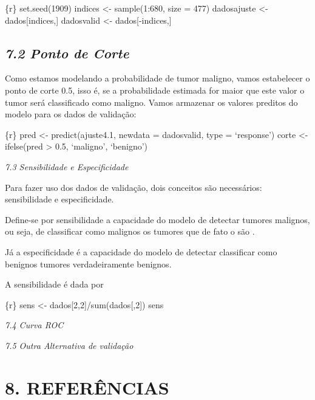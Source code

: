 \documentclass[]{article}
\begin{document}
\{r\} set.seed(1909) indices \textless{}- sample(1:680, size = 477)
dadosajuste \textless{}- dados{[}indices,{]} dadosvalid \textless{}-
dados{[}-indices,{]}

\subsection{\texorpdfstring{\emph{7.2 Ponto de
Corte}}{7.2 Ponto de Corte}}\label{ponto-de-corte}

Como estamos modelando a probabilidade de tumor maligno, vamos
estabelecer o ponto de corte 0.5, isso é, se a probabilidade estimada
for maior que este valor o tumor será classificado como maligno. Vamos
armazenar os valores preditos do modelo para os dados de validação:

\{r\} pred \textless{}- predict(ajuste4.1, newdata = dadosvalid, type =
`response') corte \textless{}- ifelse(pred \textgreater{} 0.5,
`maligno', `benigno')

\emph{7.3 Sensibilidade e Especificidade}

Para fazer uso dos dados de validação, dois conceitos são necessários:
sensibilidade e especificidade.

Define-se por sensibilidade a capacidade do modelo de detectar tumores
malignos, ou seja, de classificar como malignos os tumores que de fato o
são .

Já a especificidade é a capacidade do modelo de detectar classificar
como benignos tumores verdadeiramente benignos.

A sensibilidade é dada por

\{r\} sens \textless{}- dados{[}2,2{]}/sum(dados{[},2{]}) sens

\emph{7.4 Curva ROC}

\emph{7.5 Outra Alternativa de validação}

\section{8. REFERÊNCIAS}\label{referencias}
\end{document}

